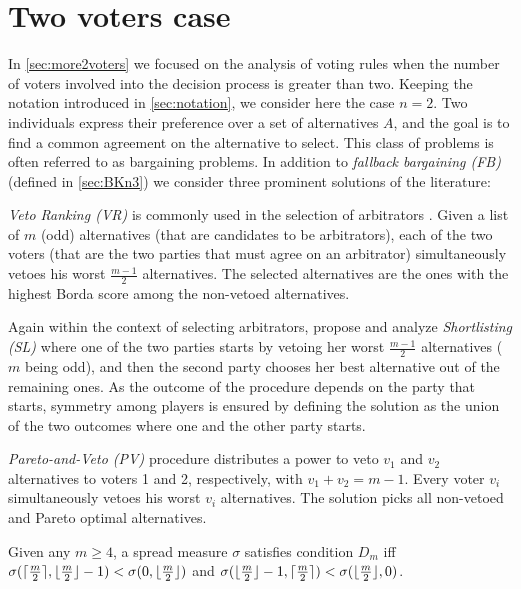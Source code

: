 \documentclass[version=3.21, pagesize, twoside=off, bibliography=totoc, DIV=calc, fontsize=12pt, a4paper]{scrartcl}
\begin{document}
 
\section{Two voters case}
In \cref{sec:more2voters} we focused on the analysis of voting rules when the number of voters involved into the decision process is greater than two. Keeping the notation introduced in \cref{sec:notation}, we consider here the case $n=2$. Two individuals express their preference over a set of alternatives $A$, and the goal is to find a common agreement on the alternative to select. This class of problems is often referred to as bargaining problems. In addition to \textit{fallback bargaining (FB)} \citep{Brams2001} (defined in \cref{sec:BKn3}) we consider three prominent solutions of the literature:

\textit{Veto Ranking (VR)} is commonly used in the selection of arbitrators \citep[see][]{Clippel2014}. Given a list of $m$ (odd) alternatives (that are candidates to be arbitrators), each of the two voters (that are the two parties that must agree on an arbitrator) simultaneously vetoes his worst $\frac{m-1}{2}$ alternatives. The selected alternatives are the ones with the highest Borda score among the non-vetoed alternatives.

Again within the context of selecting arbitrators, \citet{Clippel2014} propose and analyze \textit{Shortlisting (SL)} where one of the two parties starts by vetoing her worst $\frac{m-1}{2}$ alternatives ($m$ being odd), and then the second party chooses her best alternative out of the remaining ones. As the outcome of the procedure depends on the party that starts, symmetry among players is ensured by defining the solution as the union of the two outcomes where one and the other party starts.

\textit{Pareto-and-Veto (PV)} procedure \citep{Laslier2020} distributes a power to veto $v_1$ and $v_2$ alternatives to voters 1 and 2, respectively, with $v_1+v_2=m-1$. Every voter $v_i$ simultaneously vetoes his worst $v_i$ alternatives. The solution picks all non-vetoed and Pareto optimal alternatives.

\begin{definition}
    Given any $m \geq 4$, a spread measure $\sigma$ satisfies condition $D_m$ iff 
    $\sigma(\lceil\frac{m}{2}\rceil, \lfloor\frac{m}{2}\rfloor - 1) < \sigma(0, \lfloor\frac{m}{2}\rfloor)$ and 
    $\sigma(\lfloor\frac{m}{2}\rfloor - 1, \lceil\frac{m}{2}\rceil) < \sigma(\lfloor\frac{m}{2}\rfloor, 0)$.
\end{definition}
\end{document}
